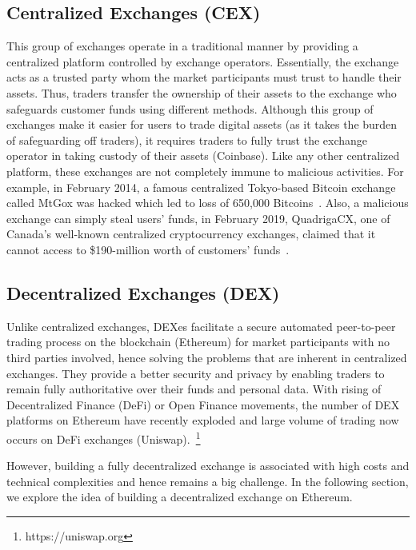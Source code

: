 \subsection{Centralized Exchanges (CEX)}\label{sec:CEX}
This group of exchanges operate in a traditional manner by providing a centralized platform controlled by exchange operators. Essentially, the exchange acts as a trusted party whom the market participants must trust to handle their assets. Thus, traders transfer the ownership of their assets to the exchange who safeguards customer funds using different methods. Although this group of exchanges make it easier for users to trade digital assets (as it takes the burden of safeguarding off traders), it requires traders to fully trust the exchange operator in taking custody of their assets (\eg Coinbase). Like any other centralized platform, these exchanges are not completely immune to malicious activities. For example, in February 2014, a famous centralized Tokyo-based Bitcoin exchange called MtGox was hacked which led to loss of 650,000 Bitcoins~\cite{TheHisto45:online}. Also, a malicious exchange can simply steal users' funds, in February 2019, QuadrigaCX, one of Canada’s well-known centralized cryptocurrency exchanges, claimed that it cannot access to \$190-million worth of customers’ funds~\cite{SEBIOrde83:online}.

\subsection{Decentralized Exchanges (DEX)}

Unlike centralized exchanges, DEXes facilitate a secure automated peer-to-peer trading process on the blockchain (\eg Ethereum) for market participants with no third parties involved, hence solving the problems that are inherent in centralized exchanges. They provide a better security and privacy by enabling traders to remain fully authoritative over their funds and personal data.  With rising of Decentralized Finance (DeFi) or Open Finance movements, the number of DEX platforms on Ethereum have recently exploded and large volume of trading now occurs on DeFi exchanges (\eg Uniswap).~\footnote{https://uniswap.org}


However, building a fully decentralized exchange is associated with high costs and technical complexities and hence remains a big challenge. In the following section, we explore the idea of building a decentralized exchange on Ethereum.



